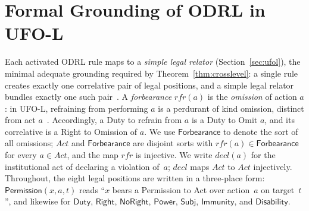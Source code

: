 \documentclass{IOS-Book-Article}
\newcommand{\PermPos}{\mathsf{Permission}}   %
\newcommand{\Duty}{\mathsf{Duty}}            %
\newcommand{\Right}{\mathsf{Right}}          %
\newcommand{\NoRight}{\mathsf{NoRight}}      %
\newcommand{\Power}{\mathsf{Power}}          %
\newcommand{\Disability}{\mathsf{Disability}} %
\newcommand{\Immunity}{\mathsf{Immunity}}
\newcommand{\Subj}{\mathsf{Subj}}       %
\newcommand{\Forbearance}{\mathsf{Forbearance}}
\theoremstyle{definition}
\begin{document}
\section{Formal Grounding of ODRL in UFO-L}
\label{sec:grounding}
Each activated ODRL rule maps to a \emph{simple legal relator}
(Section~\ref{sec:ufol}), the minimal adequate grounding required
by Theorem~\ref{thm:crosslevel}: a single rule creates exactly one
correlative pair of legal positions, and a simple legal relator
bundles exactly one such pair~\cite{griffo2023powers}. A
\emph{forbearance} $\mathit{rfr}(a)$ is the \emph{omission} of
action $a$: in UFO-L, refraining from performing $a$ is a perdurant
of kind omission, distinct from act $a$~\cite{griffo2018conceptual}.
Accordingly, a Duty to refrain from $a$ is a Duty to Omit $a$, and
its correlative is a Right to Omission of $a$. We use
$\Forbearance$ to denote the sort of all omissions; $\mathit{Act}$
and $\Forbearance$ are disjoint sorts with
$\mathit{rfr}(a)\in\Forbearance$ for every $a\in\mathit{Act}$, and
the map $\mathit{rfr}$ is injective. We write $\mathit{decl}(a)$ for
the institutional act of declaring a violation of~$a$;
$\mathit{decl}$ maps $\mathit{Act}$ to $\mathit{Act}$ injectively.
Throughout, the eight legal positions are written in a three-place
form: $\PermPos(x,a,t)$ reads ``$x$ bears a Permission to Act over
action~$a$ on target~$t$'', and likewise for $\Duty$, $\Right$,
$\NoRight$, $\Power$, $\Subj$, $\Immunity$, and $\Disability$.
\end{document}
